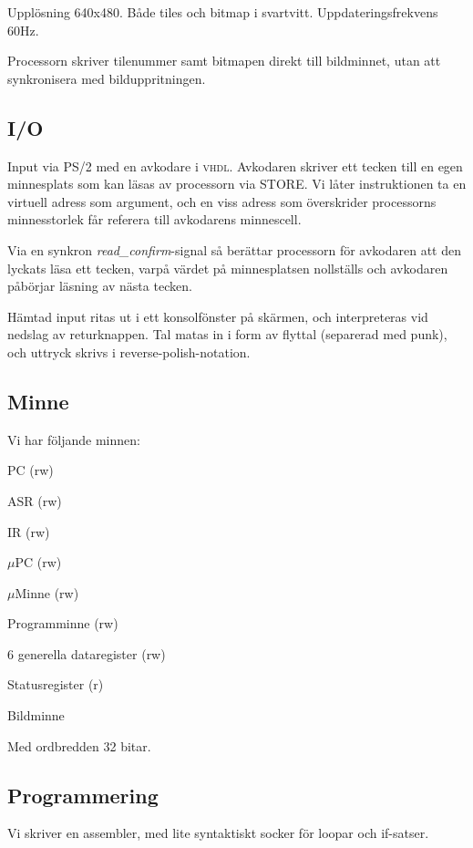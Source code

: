 \documentclass[]{article}
\begin{document}
Upplösning 640x480. Både tiles och bitmap i svartvitt. Uppdateringsfrekvens 60Hz.

Processorn skriver tilenummer samt bitmapen direkt till bildminnet, utan att synkronisera med bilduppritningen.


\subsection{I/O}
Input via PS/2 med en avkodare i \textsc{vhdl}. Avkodaren skriver ett tecken till en egen minnesplats som kan läsas av processorn via STORE. Vi låter instruktionen ta en virtuell adress som argument, och en viss adress som överskrider processorns minnesstorlek får referera till avkodarens minnescell.

Via en synkron \textit{read\_confirm}-signal så berättar processorn för avkodaren att den lyckats läsa ett tecken, varpå värdet på minnesplatsen nollställs och avkodaren påbörjar läsning av nästa tecken.

Hämtad input ritas ut i ett konsolfönster på skärmen, och interpreteras vid nedslag av returknappen. Tal matas in i form av flyttal (separerad med punk), och uttryck skrivs i reverse-polish-notation.

\newpage


\subsection{Minne}
Vi har följande minnen:
\begin{itemize*}
\item PC (rw)
\item ASR (rw)
\item IR (rw)
\item $\mu$PC (rw)
\item $\mu$Minne (rw)
\item Programminne (rw)
\item 6 generella dataregister (rw)
\item Statusregister (r)
\item Bildminne
\end{itemize*}
Med ordbredden 32 bitar.

\subsection{Programmering}
Vi skriver en assembler, med lite syntaktiskt socker för loopar och if-satser.
\end{document}
